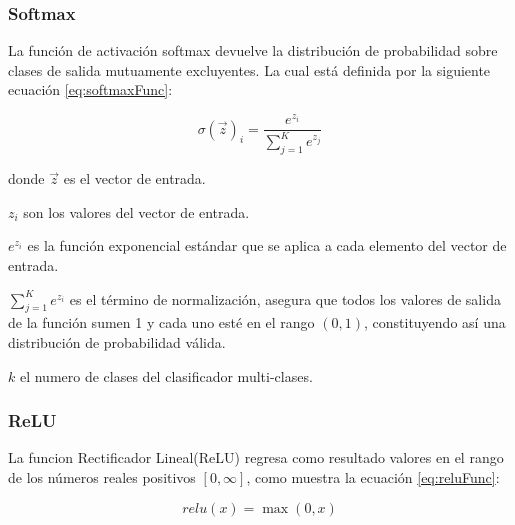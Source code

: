 \subsubsection{Softmax}

La función de activación softmax devuelve la distribución de probabilidad sobre clases de salida mutuamente excluyentes. La cual está definida por la siguiente ecuación \ref{eq:softmaxFunc}:

\begin{equation}
\label{eq:softmaxFunc}
  \sigma(\overrightarrow{z})_{i}=\frac{e^{z_{i}}}{
    \displaystyle\sum\limits_{j=1}^K e^{z_{j}}
  }
\end{equation}

donde $\overrightarrow{z}$ es el vector de entrada.

$z_i$ son los valores del vector de entrada.

$e^{z_{i}}$ es la función exponencial estándar que se aplica a cada elemento del vector de entrada.

$\displaystyle\sum\limits_{j=1}^K e^{z_{i}}$ es el término de normalización, asegura que todos los valores de salida de la función sumen 1 y cada uno esté en el rango $(0, 1)$, constituyendo así una distribución de probabilidad válida.

$k$ el numero de clases del clasificador multi-clases.

\subsubsection{ReLU}

La funcion Rectificador Lineal(ReLU) regresa como resultado valores en el rango de los números reales positivos $[0, \infty]$, como muestra la ecuación \ref{eq:reluFunc}:

\begin{equation}
\label{eq:reluFunc}
  relu(x)=\max(0,x)
\end{equation}
